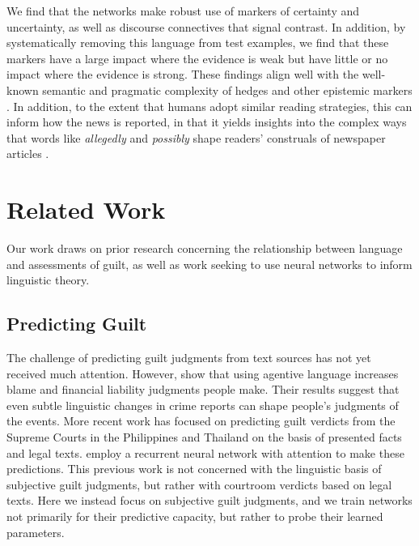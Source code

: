 \documentclass[11pt,a4paper]{article}
\newcommand{\word}[1]{\emph{#1}}
\begin{document}
We find that the networks make robust use of markers of certainty and uncertainty, as well as discourse connectives that signal contrast. In addition, by systematically removing this language from test examples, we find that these markers have a large impact where the evidence is weak but have little or no impact where the evidence is strong. These findings align well with the well-known semantic and pragmatic complexity of hedges and other epistemic markers \citep{Simons07,vonFintel:Gillies:2010,deMarneffe:Manning:Potts:2012,White-etal:2018}. In addition, to the extent that humans adopt similar reading strategies, this can inform how the news is reported, in that it yields insights into the complex ways that words like \word{allegedly} and \word{possibly} shape readers' construals of newspaper articles \citep{Erickson-etal:1978,jensen2008scientific}.


\section{Related Work}

Our work draws on prior research concerning the relationship between language and assessments of guilt, as well as work seeking to use neural networks to inform linguistic theory.


\subsection{Predicting Guilt}
The challenge of predicting guilt judgments from text sources has not yet received much attention. 
However, \citet{Fausey:Boroditsky:2010} show that using agentive language increases blame and financial liability judgments people make. Their results suggest that even subtle linguistic changes in crime reports can shape people's judgments of the events.
More recent work has focused on predicting guilt verdicts from the Supreme Courts in the Philippines \citep{virtucio2018predicting} and Thailand \citep{kowsrihawat2018predicting} on the basis of presented facts  and legal texts. \citeauthor{kowsrihawat2018predicting} employ a recurrent neural network with attention to make these predictions.
This previous work is not concerned with the linguistic basis of subjective guilt judgments, but rather with courtroom verdicts based on legal texts. Here we instead focus on subjective guilt judgments, and we train networks not primarily for their predictive capacity, but rather to probe their learned parameters.
\end{document}
